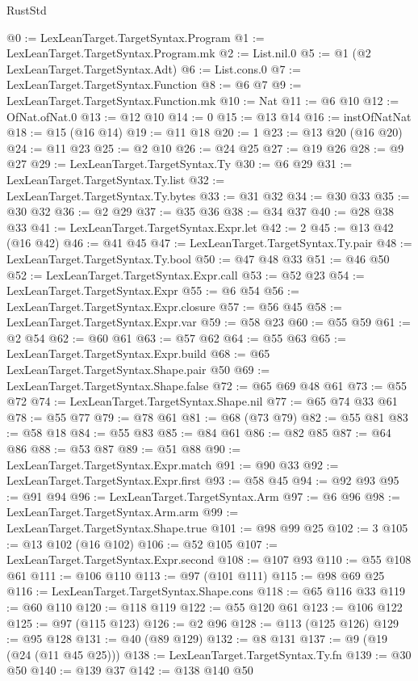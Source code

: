 \begin{lexlean}{RustStd}
\begin{coremodule}
@0 := LexLeanTarget.TargetSyntax.Program
@1 := LexLeanTarget.TargetSyntax.Program.mk
@2 := List.nil.{0}
@5 := @1 (@2 LexLeanTarget.TargetSyntax.Adt)
@6 := List.cons.{0}
@7 := LexLeanTarget.TargetSyntax.Function
@8 := @6 @7
@9 := LexLeanTarget.TargetSyntax.Function.mk
@10 := Nat
@11 := @6 @10
@12 := OfNat.ofNat.{0}
@13 := @12 @10
@14 := 0
@15 := @13 @14
@16 := instOfNatNat
@18 := @15 (@16 @14)
@19 := @11 @18
@20 := 1
@23 := @13 @20 (@16 @20)
@24 := @11 @23
@25 := @2 @10
@26 := @24 @25
@27 := @19 @26
@28 := @9 @27
@29 := LexLeanTarget.TargetSyntax.Ty
@30 := @6 @29
@31 := LexLeanTarget.TargetSyntax.Ty.list
@32 := LexLeanTarget.TargetSyntax.Ty.bytes
@33 := @31 @32
@34 := @30 @33
@35 := @30 @32
@36 := @2 @29
@37 := @35 @36
@38 := @34 @37
@40 := @28 @38 @33
@41 := LexLeanTarget.TargetSyntax.Expr.let
@42 := 2
@45 := @13 @42 (@16 @42)
@46 := @41 @45
@47 := LexLeanTarget.TargetSyntax.Ty.pair
@48 := LexLeanTarget.TargetSyntax.Ty.bool
@50 := @47 @48 @33
@51 := @46 @50
@52 := LexLeanTarget.TargetSyntax.Expr.call
@53 := @52 @23
@54 := LexLeanTarget.TargetSyntax.Expr
@55 := @6 @54
@56 := LexLeanTarget.TargetSyntax.Expr.closure
@57 := @56 @45
@58 := LexLeanTarget.TargetSyntax.Expr.var
@59 := @58 @23
@60 := @55 @59
@61 := @2 @54
@62 := @60 @61
@63 := @57 @62
@64 := @55 @63
@65 := LexLeanTarget.TargetSyntax.Expr.build
@68 := @65 LexLeanTarget.TargetSyntax.Shape.pair @50
@69 := LexLeanTarget.TargetSyntax.Shape.false
@72 := @65 @69 @48 @61
@73 := @55 @72
@74 := LexLeanTarget.TargetSyntax.Shape.nil
@77 := @65 @74 @33 @61
@78 := @55 @77
@79 := @78 @61
@81 := @68 (@73 @79)
@82 := @55 @81
@83 := @58 @18
@84 := @55 @83
@85 := @84 @61
@86 := @82 @85
@87 := @64 @86
@88 := @53 @87
@89 := @51 @88
@90 := LexLeanTarget.TargetSyntax.Expr.match
@91 := @90 @33
@92 := LexLeanTarget.TargetSyntax.Expr.first
@93 := @58 @45
@94 := @92 @93
@95 := @91 @94
@96 := LexLeanTarget.TargetSyntax.Arm
@97 := @6 @96
@98 := LexLeanTarget.TargetSyntax.Arm.arm
@99 := LexLeanTarget.TargetSyntax.Shape.true
@101 := @98 @99 @25
@102 := 3
@105 := @13 @102 (@16 @102)
@106 := @52 @105
@107 := LexLeanTarget.TargetSyntax.Expr.second
@108 := @107 @93
@110 := @55 @108 @61
@111 := @106 @110
@113 := @97 (@101 @111)
@115 := @98 @69 @25
@116 := LexLeanTarget.TargetSyntax.Shape.cons
@118 := @65 @116 @33
@119 := @60 @110
@120 := @118 @119
@122 := @55 @120 @61
@123 := @106 @122
@125 := @97 (@115 @123)
@126 := @2 @96
@128 := @113 (@125 @126)
@129 := @95 @128
@131 := @40 (@89 @129)
@132 := @8 @131
@137 := @9 (@19 (@24 (@11 @45 @25)))
@138 := LexLeanTarget.TargetSyntax.Ty.fn
@139 := @30 @50
@140 := @139 @37
@142 := @138 @140 @50

\end{coremodule}
\end{lexlean}
